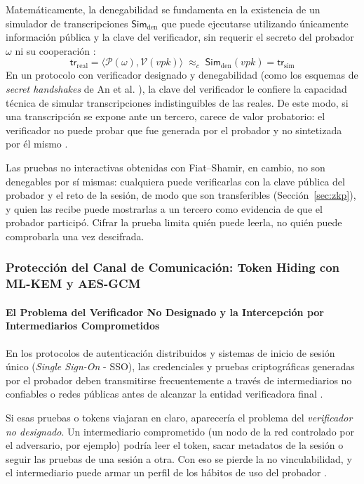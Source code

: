 Matemáticamente, la denegabilidad se fundamenta en la existencia de un simulador de transcripciones $\mathsf{Sim}_{\text{den}}$ que puede ejecutarse utilizando únicamente información pública y la clave del verificador, sin requerir el secreto del probador $\omega$ ni su cooperación \cite{an2023secrethandshakes}:
\begin{equation}
\mathsf{tr}_{\text{real}} = \langle \mathcal{P}(\omega), \mathcal{V}(vpk) \rangle \;\approx_c\; \mathsf{Sim}_{\text{den}}(vpk) = \mathsf{tr}_{\text{sim}}
\end{equation}
En un protocolo con verificador designado y denegabilidad (como los esquemas de \textit{secret handshakes} de An et al. \cite{an2023secrethandshakes}), la clave del verificador le confiere la capacidad técnica de simular transcripciones indistinguibles de las reales. De este modo, si una transcripción se expone ante un tercero, carece de valor probatorio: el verificador no puede probar que fue generada por el probador y no sintetizada por él mismo \cite{an2023secrethandshakes}.

Las pruebas no interactivas obtenidas con Fiat--Shamir, en cambio, no son denegables por sí mismas: cualquiera puede verificarlas con la clave pública del probador y el reto de la sesión, de modo que son transferibles (Sección~\ref{sec:zkp}), y quien las recibe puede mostrarlas a un tercero como evidencia de que el probador participó. Cifrar la prueba limita quién puede leerla, no quién puede comprobarla una vez descifrada.

\subsubsection{Protección del Canal de Comunicación: Token Hiding con ML-KEM y AES-GCM}

\paragraph{El Problema del Verificador No Designado y la Intercepción por Intermediarios Comprometidos}

En los protocolos de autenticación distribuidos y sistemas de inicio de sesión único (\textit{Single Sign-On} - SSO), las credenciales y pruebas criptográficas generadas por el probador deben transmitirse frecuentemente a través de intermediarios no confiables o redes públicas antes de alcanzar la entidad verificadora final \cite{ma2026laasso}.

Si esas pruebas o tokens viajaran en claro, aparecería el problema del \textit{verificador no designado}. Un intermediario comprometido (un nodo de la red controlado por el adversario, por ejemplo) podría leer el token, sacar metadatos de la sesión o seguir las pruebas de una sesión a otra. Con eso se pierde la no vinculabilidad, y el intermediario puede armar un perfil de los hábitos de uso del probador \cite{ma2026laasso}.

